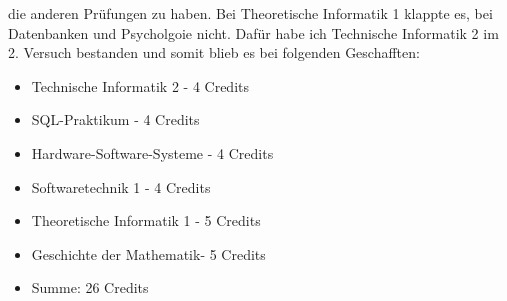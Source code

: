 die anderen Prüfungen zu haben. Bei Theoretische Informatik 1 klappte
es, bei Datenbanken und Psycholgoie nicht. Dafür habe ich Technische Informatik 2 im
2. Versuch bestanden und somit blieb es bei folgenden Geschafften:
\begin{itemize}
\item Technische Informatik 2 - 4 Credits
\item SQL-Praktikum - 4 Credits
\item Hardware-Software-Systeme - 4 Credits
\item Softwaretechnik 1 - 4 Credits
\item Theoretische Informatik 1 - 5 Credits
\item Geschichte der Mathematik- 5 Credits
\item Summe: 26 Credits
\end{itemize}

